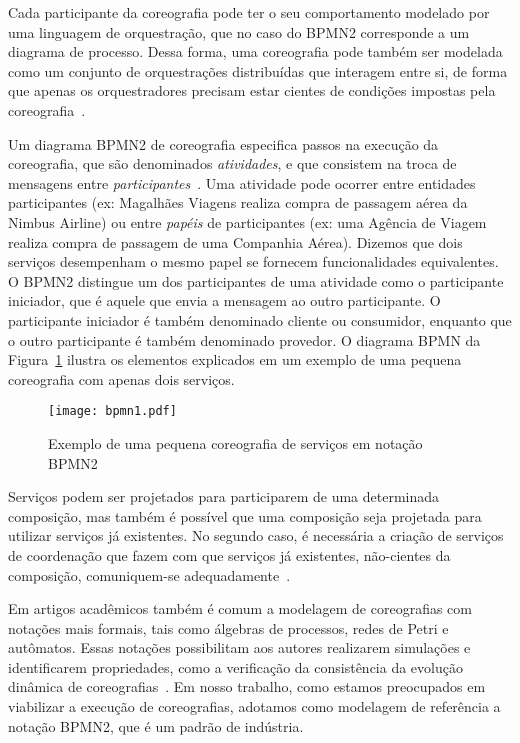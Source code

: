 Cada participante da coreografia pode ter o seu comportamento modelado por uma linguagem de orquestração, que no caso do BPMN2 corresponde a um diagrama de processo. Dessa forma, uma coreografia pode também ser modelada como um conjunto de orquestrações distribuídas que interagem entre si, de forma que apenas os orquestradores precisam estar cientes de condições impostas pela coreografia~\cite{Poulin2011Collaboration}.

Um diagrama BPMN2 de coreografia especifica passos na execução da coreografia, que são denominados \emph{atividades}, e que consistem na troca de mensagens entre \emph{participantes}~\cite{BPMN2011}. Uma atividade pode ocorrer entre entidades participantes (ex: Magalhães Viagens realiza compra de passagem aérea da Nimbus Airline) ou entre \emph{papéis} de participantes (ex: uma Agência de Viagem realiza compra de passagem de uma Companhia Aérea). Dizemos que dois serviços desempenham o mesmo papel se fornecem funcionalidades equivalentes. O BPMN2 distingue um dos participantes de uma atividade como o participante iniciador, que é aquele que envia a mensagem ao outro participante. O participante iniciador é também denominado cliente ou consumidor, enquanto que o outro participante é também denominado provedor. O diagrama BPMN da Figura~\ref{fig:bpmn1} ilustra os elementos explicados em um exemplo de uma pequena coreografia com apenas dois serviços.

\begin{figure}[!h]
  \centering
  \texttt{[image: bpmn1.pdf]} 
  \caption{Exemplo de uma pequena coreografia de serviços em notação BPMN2}
  \label{fig:bpmn1} 
\end{figure}

Serviços podem ser projetados para participarem de uma determinada composição, mas também é possível que uma composição seja projetada para utilizar serviços já existentes. No segundo caso, é necessária a criação de serviços de coordenação que fazem com que serviços já existentes, não-cientes da composição, comuniquem-se adequadamente~\cite{Autili2013Synthesis}. 

Em artigos acadêmicos também é comum a modelagem de coreografias com notações mais formais, tais como álgebras de processos, redes de Petri e autômatos. Essas notações possibilitam aos autores realizarem simulações e identificarem propriedades, como a verificação da consistência da evolução dinâmica de coreografias~\cite{Cicirelli2010Dynamically}. Em nosso trabalho, como estamos preocupados em viabilizar a execução de coreografias, adotamos como modelagem de referência a notação BPMN2, que é um padrão de indústria.


